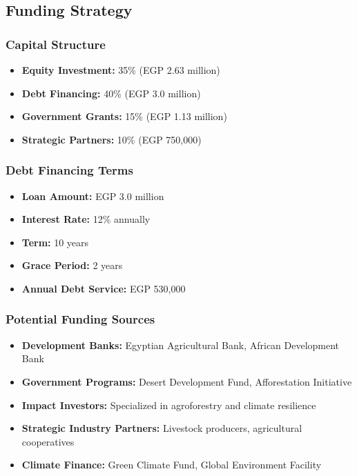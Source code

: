 \subsection{Funding Strategy}

\subsubsection{Capital Structure}
\begin{itemize}
    \item \textbf{Equity Investment:} 35\% (EGP 2.63 million)
    \item \textbf{Debt Financing:} 40\% (EGP 3.0 million)
    \item \textbf{Government Grants:} 15\% (EGP 1.13 million)
    \item \textbf{Strategic Partners:} 10\% (EGP 750,000)
\end{itemize}

\subsubsection{Debt Financing Terms}
\begin{itemize}
    \item \textbf{Loan Amount:} EGP 3.0 million
    \item \textbf{Interest Rate:} 12\% annually
    \item \textbf{Term:} 10 years
    \item \textbf{Grace Period:} 2 years
    \item \textbf{Annual Debt Service:} EGP 530,000
\end{itemize}

\subsubsection{Potential Funding Sources}
\begin{itemize}
    \item \textbf{Development Banks:} Egyptian Agricultural Bank, African Development Bank
    \item \textbf{Government Programs:} Desert Development Fund, Afforestation Initiative
    \item \textbf{Impact Investors:} Specialized in agroforestry and climate resilience
    \item \textbf{Strategic Industry Partners:} Livestock producers, agricultural cooperatives
    \item \textbf{Climate Finance:} Green Climate Fund, Global Environment Facility
\end{itemize}

